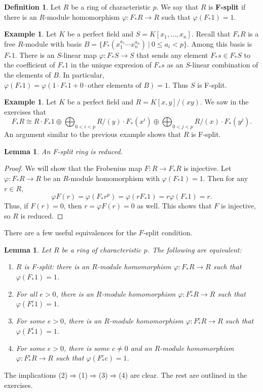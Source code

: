 \documentclass[12pt]{amsart}
\newtheorem{lemma}[theorem]{Lemma}
\theoremstyle{definition}
\newtheorem{definition}[theorem]{Definition}
\newtheorem{example}[theorem]{Example}
\numberwithin{equation}{theorem}
\def\phi{\varphi}
\def\to{\longrightarrow}
\begin{document}
\begin{definition} Let $R$ be a ring of characteristic $p$. We say that $R$ is \textbf{F-split} if there is an $R$-module homomorphism $\phi: F_*R \to R$ such that $\phi(F_*1) = 1$.
\end{definition}

\begin{example}
Let $K$ be a perfect field and $S=K[x_1,\dots,x_n]$. Recall that $F_*R$ is a free $R$-module with basis $B= \{ F_*(x_1^{a_1} \cdots x_n^{a_n}) \ | \ 0\leq a_i < p\}$. Among this basis is $F_*1$. There is an $S$-linear map $\phi:F_* S \to S$ that sends any element $F_* s \in F_* S$ to the coefficient of $F_*1$ in the unique expresion of $F_*s$ as an $S$-linear combination of the elements of $B$. In particular, $\phi(F_*1) = \phi(1 \cdot F_*1 + 0 \cdot \text{other elements of $B$}) = 1$. Thus $S$ is F-split.
\end{example}

\begin{example}
Let $K$ be a perfect field and $R=K[x,y]/(xy)$. We saw in the exercises that
\[ F_* R \cong R \cdot F_*1 \oplus \bigoplus_{0<i<p} R/(y) \cdot F_*(x^i) \oplus \bigoplus_{0<j<p} R/(x) \cdot F_*(y^j).\] 
An argument similar to the previous example shows that $R$ is F-split.
\end{example}


\begin{lemma} An F-split ring is reduced.
\end{lemma}
\begin{proof} We will show that the Frobenius map $F: R \to F_*R$ is injective. Let $\phi:F_*R \to R$ be an $R$-module homomorphism with $\phi(F_*1)=1$. Then for any $r\in R$,
\[ \phi F (r) = \phi(F_* r^p) =\phi(r F_*1) = r \phi(F_*1) = r.\]
Thus, if $F(r) = 0$, then $r=\phi F(r)=0$ as well. This shows that $F$ is injective, so $R$ is reduced.
\end{proof}



There are a few useful equivalences for the $F$-split condition.

\begin{lemma}\label{lem:equivs} Let $R$ be a ring of characteristic $p$. The following are equivalent:
\begin{enumerate}
\item $R$ is F-split:  there is an $R$-module homomorphism $\phi: F_*R \to R$ such that $\phi(F_*1) = 1$.
\item For all $e>0$, there is an $R$-module homomorphism $\phi: F^e_*R \to R$ such that $\phi(F^e_*1) = 1$.
\item For some $e>0$, there is an $R$-module homomorphism $\phi: F^e_*R \to R$ such that $\phi(F^e_*1) = 1$.
\item For some $e>0$, there is some $c\neq 0$ and an $R$-module homomorphism $\phi: F^e_*R \to R$ such that $\phi(F^e_*c) = 1$.
\end{enumerate}
\end{lemma}
The implications (2)$\Rightarrow$(1)$\Rightarrow$(3)$\Rightarrow$(4) are clear. The rest are outlined in the exercises.
\end{document}
